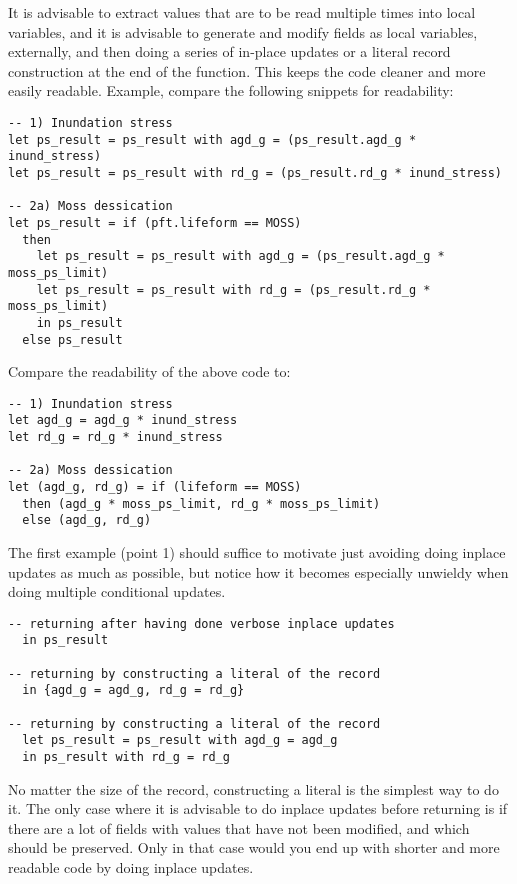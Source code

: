 It is advisable to extract values that are to be read multiple times into local variables, and it is advisable to generate and modify fields as local variables, externally, and then doing a series of in-place updates or a literal record construction at the end of the function. This keeps the code cleaner and more easily readable. Example, compare the following snippets for readability:
\newpage
\begin{verbatim}
-- 1) Inundation stress
let ps_result = ps_result with agd_g = (ps_result.agd_g * inund_stress)
let ps_result = ps_result with rd_g = (ps_result.rd_g * inund_stress)

-- 2a) Moss dessication
let ps_result = if (pft.lifeform == MOSS)
  then
    let ps_result = ps_result with agd_g = (ps_result.agd_g * moss_ps_limit)
    let ps_result = ps_result with rd_g = (ps_result.rd_g * moss_ps_limit)
    in ps_result
  else ps_result
\end{verbatim}

Compare the readability of the above code to:

\begin{verbatim}
-- 1) Inundation stress
let agd_g = agd_g * inund_stress
let rd_g = rd_g * inund_stress

-- 2a) Moss dessication
let (agd_g, rd_g) = if (lifeform == MOSS)
  then (agd_g * moss_ps_limit, rd_g * moss_ps_limit)
  else (agd_g, rd_g)
\end{verbatim}

The first example (point 1) should suffice to motivate just avoiding doing inplace updates as much as possible, but notice how it becomes especially unwieldy when doing multiple conditional updates.

\begin{verbatim}
-- returning after having done verbose inplace updates
  in ps_result

-- returning by constructing a literal of the record
  in {agd_g = agd_g, rd_g = rd_g}

-- returning by constructing a literal of the record
  let ps_result = ps_result with agd_g = agd_g
  in ps_result with rd_g = rd_g
\end{verbatim}

No matter the size of the record, constructing a literal is the simplest way to do it. The only case where it is advisable to do inplace updates before returning is if there are a lot of fields with values that have not been modified, and which should be preserved. Only in that case would you end up with shorter and more readable code by doing inplace updates.

